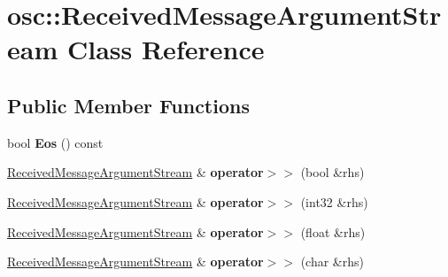 \hypertarget{classosc_1_1_received_message_argument_stream}{}\section{osc\+:\+:Received\+Message\+Argument\+Stream Class Reference}
\label{classosc_1_1_received_message_argument_stream}
\subsection*{Public Member Functions}
\begin{DoxyCompactItemize}
\item 
\mbox{\label{classosc_1_1_received_message_argument_stream_abe96142a6a94bb29d3de65967cb3bec8}} 
bool {\bfseries Eos} () const
\item 
\mbox{\label{classosc_1_1_received_message_argument_stream_ab953c890f8ba204783fc83d4b9ddeb4a}} 
\hyperlink{classosc_1_1_received_message_argument_stream}{Received\+Message\+Argument\+Stream} \& {\bfseries operator$>$$>$} (bool \&rhs)
\item 
\mbox{\label{classosc_1_1_received_message_argument_stream_a792ee08d457595d978f95b97aae4e0d3}} 
\hyperlink{classosc_1_1_received_message_argument_stream}{Received\+Message\+Argument\+Stream} \& {\bfseries operator$>$$>$} (int32 \&rhs)
\item 
\mbox{\label{classosc_1_1_received_message_argument_stream_a1470c7deda25cf598185cd94952b1dfb}} 
\hyperlink{classosc_1_1_received_message_argument_stream}{Received\+Message\+Argument\+Stream} \& {\bfseries operator$>$$>$} (float \&rhs)
\item 
\mbox{\label{classosc_1_1_received_message_argument_stream_a7ba0bf860331d4823eab1ebb80979160}} 
\hyperlink{classosc_1_1_received_message_argument_stream}{Received\+Message\+Argument\+Stream} \& {\bfseries operator$>$$>$} (char \&rhs)
\item 
\mbox{\label{classosc_1_1_received_message_argument_stream_a41299ab78f6b76b895c465d5b161cef9}} 

\end{DoxyCompactItemize}
